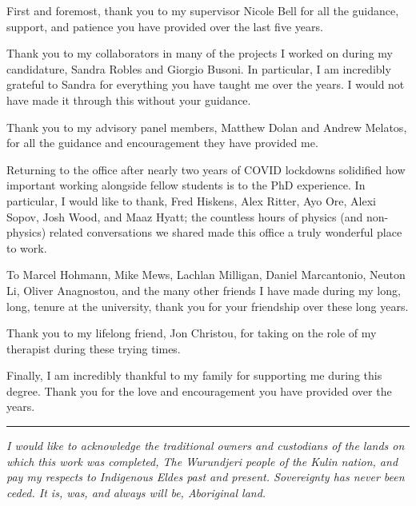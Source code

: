 \begin{acknowledgements}

  First and foremost, thank you to my supervisor Nicole Bell for all the guidance, support, and patience you have provided over the last five years. 

  
  Thank you to my collaborators in many of the projects I worked on during my candidature, Sandra Robles and Giorgio Busoni. 
  In particular, I am incredibly grateful to Sandra for everything you have taught me over the years. I would not have made it through this without your guidance. 

  Thank you to my advisory panel members, Matthew Dolan and Andrew Melatos, for all the guidance and encouragement they have provided me.


  Returning to the office after nearly two years of COVID lockdowns solidified how important working alongside fellow students is to the PhD experience. In particular, I would like to thank, Fred Hiskens, Alex Ritter, Ayo Ore, Alexi Sopov, Josh Wood, and Maaz Hyatt; the countless hours of physics (and non-physics) related conversations we shared made this office a truly wonderful place to work.
 
  To Marcel Hohmann, Mike Mews, Lachlan Milligan, Daniel Marcantonio, Neuton Li, Oliver Anagnostou, and the many other friends I have made during my long, long, tenure at the university, thank you for your friendship over these long years. 

  Thank you to my lifelong friend, Jon Christou, for taking on the role of my therapist during these trying times.

  Finally, I am incredibly thankful to my family for supporting me during this degree. Thank you for the love and encouragement you have provided over the years. 

  \vfill
  \noindent\rule{\textwidth}{0.5pt}
  \textit{I would like to acknowledge the traditional owners and custodians of the lands on which this work was completed, The Wurundjeri people of the Kulin nation, and pay my respects to Indigenous Eldes past and present. Sovereignty has never been ceded. It is, was, and always will be, Aboriginal land.}

\end{acknowledgements}

